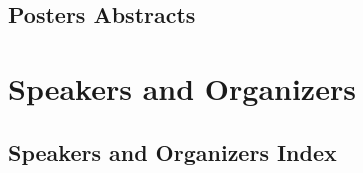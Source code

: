 \documentclass[twoside]{book}
\begin{document}
\chapter*{Posters Abstracts}

\label{PP1}


\part{Speakers and Organizers}
\chapter*{Speakers and Organizers Index}
\vspace{0.5cm}


\end{document}
